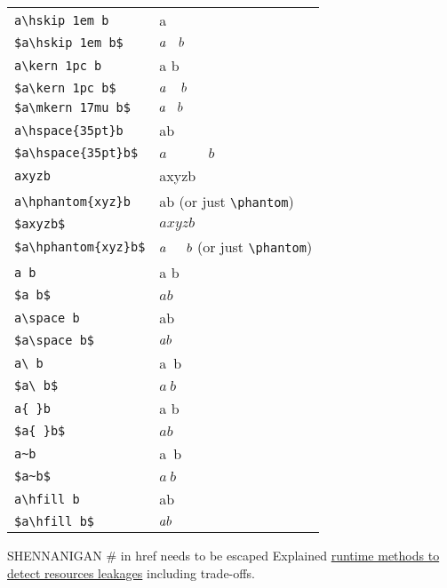 \begin{tabular}{lp{5cm}}
  \verb|a\hskip 1em b|            & a\hskip 1em b \\
  \verb|$a\hskip 1em b$|          & $a\hskip 1em b$ \\
  \verb|a\kern 1pc b|             & a\kern 1pc b \\
  \verb|$a\kern 1pc b$|           & $a\kern 1pc b$ \\
  \verb|$a\mkern 17mu b$|         & $a\mkern 17mu b$ \\
  \verb|a\hspace{35pt}b|          & a\hspace{35pt}b \\
  \verb|$a\hspace{35pt}b$|        & $a\hspace{35pt}b$ \\
  \verb|axyzb|                    & axyzb \\
  \verb|a\hphantom{xyz}b|         & a\hphantom{xyz}b (or just \verb|\phantom|) \\
  \verb|$axyzb$|                  & $axyzb$ \\
  \verb|$a\hphantom{xyz}b$|       & $a\hphantom{xyz}b$ (or just \verb|\phantom|) \\
  \verb|a b|                      & a b \\
  \verb|$a b$|                    & $a b$ \\
  \verb|a\space b|                & a\space b \\
  \verb|$a\space b$|              & $a\space b$ \\
  \verb|a\ b|                     & a\ b \\
  \verb|$a\ b$|                   & $a\ b$ \\
  \verb|a{ }b|                    & a{ }b \\
  \verb|$a{ }b$|                  & $a{ }b$ \\
  \verb|a~b|                      & a~b \\
  \verb|$a~b$|                    & $a~b$ \\
  \verb|a\hfill b|                & a\hfill b \\
  \verb|$a\hfill b$|              & $a\hfill b$
\end{tabular}

SHENNANIGAN
# in href needs to be escaped
Explained \href{https://github.com/ziglang/zig/issues/6152\#issuecomment-1369286411}{\color{darkblue}runtime methods to detect resources leakages} including trade-offs.
